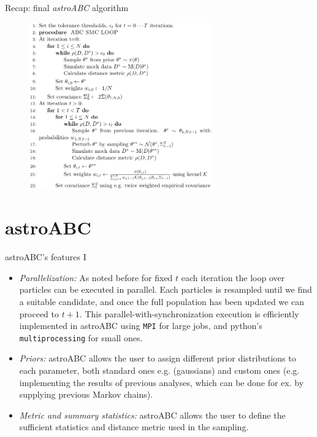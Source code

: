 \documentclass{beamer}
\theoremstyle{remark}
\newcommand{\nologo}{\setbeamertemplate{logo}{}} %
\begin{document}
{\nologo
\begin{frame}{Recap: final \textit{astroABC} algorithm}
\begin{figure}[H]
    \centering
    \includegraphics[width=0.7\textwidth, height=0.6\textwidth]{astroabc_algorithm.png}
\end{figure}
\end{frame}
}




\section{astroABC}
\begin{frame}{astroABC's features I}
\begin{itemize}[<+->]
    \item \textit{Parallelization:} As noted before for fixed $t$ each iteration the loop over particles can be executed in parallel. Each particles is resampled until we find a suitable candidate, and once the full population has been updated we can proceed to $t+1$. This parallel-with-synchronization execution is efficiently implemented in astroABC using \texttt{MPI} for large jobs, and python's \texttt{multiprocessing} for small ones.
    \item \textit{Priors:} astroABC allows the user to assign different prior distributions to each parameter, both standard ones e.g. (gaussians) and custom ones (e.g. implementing the results of previous analyses, which can be done for ex. by supplying previous Markov chains).
    \item \textit{Metric and summary statistics:} astroABC allows the user to define the sufficient statistics and distance metric used in the sampling.
\end{itemize}
\end{frame}
\end{document}
